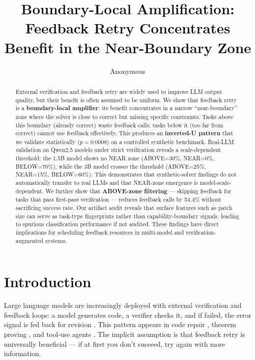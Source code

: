 \documentclass[11pt,a4paper]{article}
\title{Boundary-Local Amplification: Feedback Retry Concentrates Benefit in the Near-Boundary Zone}
\author{Anonymous}
\date{}
\begin{document}
\maketitle

\begin{abstract}
External verification and feedback retry are widely used to improve LLM output quality, but their benefit is often assumed to be uniform. We show that feedback retry is a \textbf{boundary-local amplifier}: its benefit concentrates in a narrow ``near-boundary'' zone where the solver is close to correct but missing specific constraints. Tasks above this boundary (already correct) waste feedback calls; tasks below it (too far from correct) cannot use feedback effectively. This produces an \textbf{inverted-U pattern} that we validate statistically ($p = 0.0008$) on a controlled synthetic benchmark. Real-LLM validation on Qwen2.5 models under strict verification reveals a scale-dependent threshold: the 1.5B model shows no NEAR zone (ABOVE=30\%, NEAR=0\%, BELOW=70\%), while the 3B model crosses the threshold (ABOVE=25\%, NEAR=15\%, BELOW=60\%). This demonstrates that synthetic-solver findings do not automatically transfer to real LLMs and that NEAR-zone emergence is model-scale-dependent. We further show that \textbf{ABOVE-zone filtering} --- skipping feedback for tasks that pass first-pass verification --- reduces feedback calls by 54.4\% without sacrificing success rate. Our artifact audit reveals that surface features such as patch size can serve as task-type fingerprints rather than capability-boundary signals, leading to spurious classification performance if not audited. These findings have direct implications for scheduling feedback resources in multi-model and verification-augmented systems.
\end{abstract}

\section{Introduction}

Large language models are increasingly deployed with external verification and feedback loops: a model generates code, a verifier checks it, and if failed, the error signal is fed back for revision \citep{chen2023teaching, olausson2023demystifying}. This pattern appears in code repair \citep{gupta2023grace}, theorem proving \citep{polu2020generative}, and tool-use agents \citep{schick2023toolformer}. The implicit assumption is that feedback retry is universally beneficial --- if at first you don't succeed, try again with more information.
\end{document}
